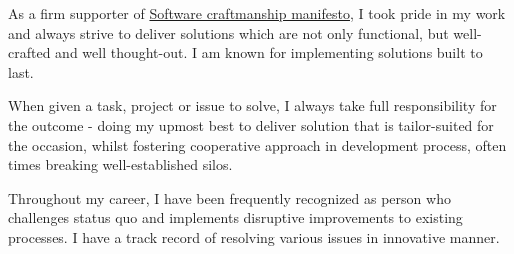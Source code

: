 \documentclass[9pt]{style/developercv}
\begin{document}
\begin{minipage}[t]{0.3\textwidth}
    \vspace{-\baselineskip}


    As a firm supporter of \href{https://manifesto.softwarecraftmanship.org/}{Software craftmanship manifesto},
    I took pride in my work and always strive to deliver solutions which are not only functional, 
    but well-crafted and well thought-out. I am known for implementing solutions built to last.

\end{minipage}
\hfill
\begin{minipage}[t]{0.3\textwidth}
    \vspace{-\baselineskip}
    
    
    When given a task, project or issue to solve, I always take full responsibility for the outcome - doing my upmost
    best to deliver solution that is tailor-suited for the occasion, whilst fostering cooperative approach in development
    process, often times breaking well-established silos.
\end{minipage}
\hfill
\begin{minipage}[t]{0.3\textwidth}
    \vspace{-\baselineskip}
    
    
    Throughout my career, I have been frequently recognized as person who challenges status quo and implements disruptive
    improvements to existing processes. I have a track record of resolving various issues in innovative manner. 
\end{minipage}

\vspace{0.75cm}


\end{document}
